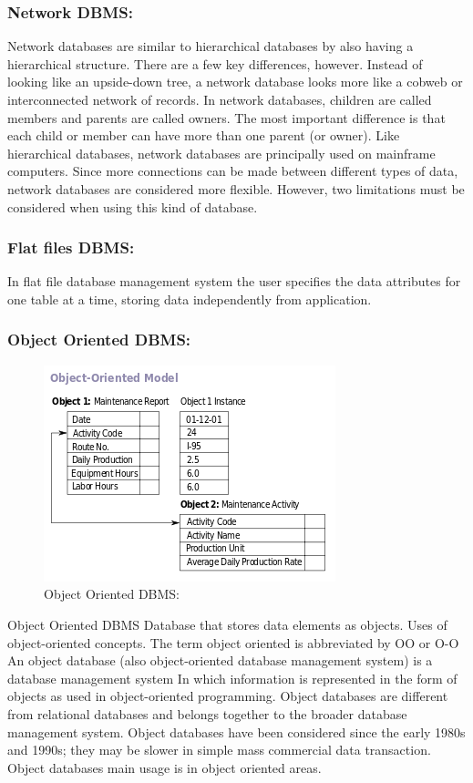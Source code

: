 \documentclass[12pt]{article} %
\begin{document}
\subsubsection{\textbf{Network DBMS: }}
    Network databases are similar to hierarchical databases by also having a hierarchical structure. There are a few key differences, however. Instead of looking like an upside-down tree, a network database looks more like a cobweb or interconnected network of records. In network databases, children are called members and parents are called owners. The most important difference is that each child or member can have more than one parent (or owner). 
Like hierarchical databases, network databases are principally used on mainframe computers. Since more connections can be made between different types of data, network databases are considered more flexible. However, two limitations must be considered when using this kind of database.



\subsubsection{\textbf{Flat files DBMS:}}
 In flat file database management system the user specifies the data attributes for one table at a time, storing data independently from application.
 
\subsubsection{\textbf{Object Oriented DBMS:}}
 \begin{figure}[H]
 \centering
   \includegraphics[width=0.8\linewidth]{object.png}
  \caption{Object Oriented DBMS:}
  \label{fig:figure 14}
\end{figure}
Object Oriented DBMS Database that stores data elements as objects. Uses of object-oriented concepts. The term object oriented is abbreviated by OO or O-O
An object database (also object-oriented database management system) is a database management system 
In which information is represented in the form of objects as used in object-oriented programming. Object databases are different from relational databases and belongs together to the broader database management system.
Object databases have been considered since the early 1980s and 1990s; they may be slower in simple mass commercial data transaction. Object databases main usage is in object oriented areas. 
                         
\end{document}
